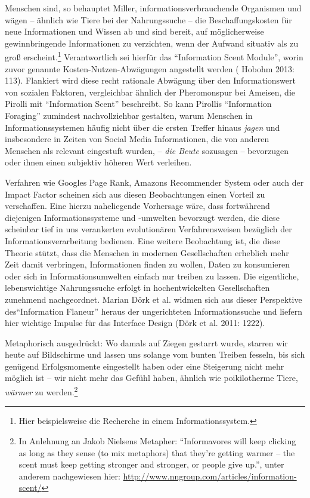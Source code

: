 \documentclass[a4paper,
fontsize=11pt,
oneside,
numbers=noperiodatend,
parskip=half-,
bibliography=totoc,
final
]{scrartcl}
\begin{document}
Menschen sind, so behauptet Miller, informationsverbrauchende Organismen
und wägen -- ähnlich wie Tiere bei der Nahrungssuche -- die
Beschaffungskosten für neue Informationen und Wissen ab und sind bereit,
auf möglicherweise gewinnbringende Informationen zu verzichten, wenn der
Aufwand situativ als zu groß erscheint.\footnote{Hier beispielsweise die
  Recherche in einem Informationssystem.} Verantwortlich sei hierfür das
\enquote{Information Scent Module}, worin zuvor genannte
Kosten-Nutzen-Abwägungen angestellt werden ( Hobohm 2013: 113).
Flankiert wird diese recht rationale Abwägung über den Informationswert
von sozialen Faktoren, vergleichbar ähnlich der Pheromonspur bei
Ameisen, die Pirolli mit \enquote{Information Scent} beschreibt. So kann
Pirollis \enquote{Information Foraging} zumindest nachvollziehbar
gestalten, warum Menschen in Informationssystemen häufig nicht über die
ersten Treffer hinaus \emph{jagen} und insbesondere in Zeiten von Social
Media Informationen, die von anderen Menschen als relevant eingestuft
wurden, -- \emph{die Beute} sozusagen -- bevorzugen oder ihnen einen
subjektiv höheren Wert verleihen.

Verfahren wie Googles Page Rank, Amazons Recommender System oder auch
der Impact Factor scheinen sich aus diesen Beobachtungen einen Vorteil
zu verschaffen. Eine hierzu naheliegende Vorhersage wäre, dass
fortwährend diejenigen Informationssysteme und -umwelten bevorzugt
werden, die diese scheinbar tief in uns verankerten evolutionären
Verfahrensweisen bezüglich der Informationsverarbeitung bedienen. Eine
weitere Beobachtung ist, die diese Theorie stützt, dass die Menschen in
modernen Gesellschaften erheblich mehr Zeit damit verbringen,
Informationen finden zu wollen, Daten zu konsumieren oder sich in
Informationsumwelten einfach nur treiben zu lassen. Die eigentliche,
lebenswichtige Nahrungssuche erfolgt in hochentwickelten Gesellschaften
zunehmend nachgeordnet. Marian Dörk et al. widmen sich aus dieser
Perspektive des\enquote{Information Flaneur} heraus der ungerichteten
Informationssuche und liefern hier wichtige Impulse für das Interface
Design (Dörk et al. 2011: 1222).

Metaphorisch ausgedrückt: Wo damals auf Ziegen gestarrt wurde, starren
wir heute auf Bildschirme und lassen uns solange vom bunten Treiben
fesseln, bis sich genügend Erfolgsmomente eingestellt haben oder eine
Steigerung nicht mehr möglich ist -- wir nicht mehr das Gefühl haben,
ähnlich wie poikilotherme Tiere, \emph{wärmer} zu werden.\footnote{In
  Anlehnung an Jakob Nielsens Metapher: \enquote{Informavores will keep
  clicking as long as they sense (to mix metaphors) that they're getting
  warmer -- the scent must keep getting stronger and stronger, or people
  give up.}, unter anderem nachgewiesen hier:
  \href{numbering.xml}{http://www.nngroup.com/articles/information-scent/}}
\end{document}
